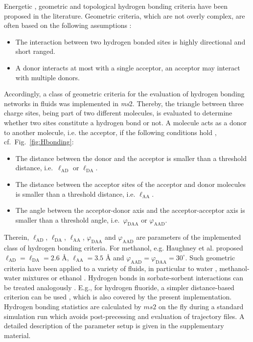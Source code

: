 \documentclass[preprint,12pt]{elsarticle}
\begin{document}
Energetic \cite{Stillinger80}, geometric \cite{Haughney1987} and topological \cite{HI10} hydrogen bonding criteria have been proposed in the literature. Geometric criteria, which are not overly complex, are often based on the following assumptions \cite{RMHH12}:
\begin{itemize}
	\item The interaction between two hydrogen bonded sites is highly directional and short ranged.
	\item A donor interacts at most with a single acceptor, an acceptor may interact with multiple donors.
\end{itemize}
Accordingly, a class of geometric criteria for the evaluation of hydrogen bonding networks in fluids was implemented in \textit{ms}2. Thereby, the triangle between three charge sites, being part of two different molecules, is evaluated to determine whether two sites constitute a hydrogen bond or not. A molecule acts as a donor to another molecule, i.e. the acceptor, if the following conditions hold \cite{Haughney1987, RMHH12, LC93, CC06}, cf.\ Fig.\ \ref{fig:Hbonding}:
\begin{itemize}
	\item{} The distance between the donor and the acceptor is smaller than a threshold distance, i.e.\ $\ell_\mathrm{AD}$ or $\ell_\mathrm{DA}$.
        \item{} The distance between the acceptor sites of the acceptor and donor molecules is smaller than a threshold distance, i.e. $\ell_\mathrm{AA}$.
        \item{} The angle between the acceptor-donor axis and the acceptor-acceptor axis is smaller than a threshold angle, i.e.\ $\varphi_\mathrm{DAA}$ or $\varphi_\mathrm{AAD}$. 
\end{itemize}
Therein, $\ell_\mathrm{AD}$, $\ell_\mathrm{DA}$, $\ell_\mathrm{AA}$, $\varphi_\mathrm{DAA}$ and $\varphi_\mathrm{AAD}$ are parameters of the implemented class of hydrogen bonding criteria. For methanol, e.g. Haughney et al. \cite{Haughney1987} proposed $\ell_\mathrm{AD} = \ell_\mathrm{DA} = 2.6$ \AA{}, $\ell_\mathrm{AA} = 3.5$ \AA{} and $\varphi_\mathrm{AAD}= \varphi_\mathrm{DAA} = 30^\circ$. Such geometric criteria have been applied to a variety of fluids, in particular to water \cite{LC93, CC06, LC96}, methanol-water mixtures \cite{CC14, gue08} or ethanol \cite{RMHH12, SPG97, XYH09}. Hydrogen bonds in sorbate-sorbent interactions can be treated analogously \cite{BKS14}. E.g., for hydrogen fluoride, a simpler distance-based criterion can be used \cite{KBMP03}, which is also covered by the present implementation. \textcolor[rgb]{0,0.58,0}{Hydrogen bonding statistics are calculated by $ms2$ on the fly during a standard simulation run which avoids post-precessing and evaluation of trajectory files.} A detailed description of the parameter setup is given in the supplementary material. 
\end{document}

